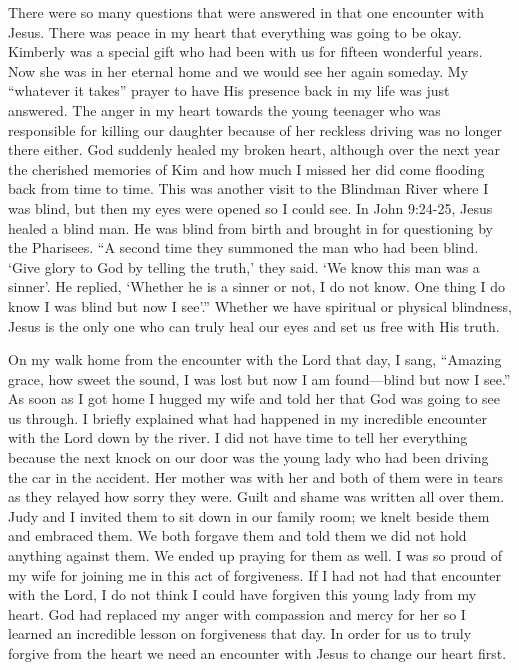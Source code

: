 \documentclass[oneside]{book}
\begin{document}
There were so many questions that were answered in that one encounter with Jesus. There was peace in my heart that everything was going to be okay. Kimberly was a special gift who had been with us for fifteen wonderful years. Now she was in her eternal home and we would see her again someday. My “whatever it takes” prayer to have His presence back in my life was just answered. The anger in my heart towards the young teenager who was responsible for killing our daughter because of her reckless driving was no longer there either. God suddenly healed my broken heart, although over the next year the cherished memories of Kim and how much I missed her did come flooding back from time to time. This was another visit to the Blindman River where I was blind, but then my eyes were opened so I could see. In John 9:24-25, Jesus  healed a blind man. He was blind from birth and brought in for questioning by the Pharisees. “A second time they summoned the man who had been blind. ‘Give glory to God by telling the truth,’ they said. ‘We know this man was a sinner’. He replied, ‘Whether he is a sinner or not, I do not know. One thing I do know I was blind but now I see’.” Whether we have spiritual or physical blindness, Jesus is the only one who can truly heal our eyes and set us free with His truth.

On my walk home from the encounter with the Lord that day, I sang, “Amazing grace, how sweet the sound, I was lost but now I am found—blind but now I see.” As soon as I got home I hugged my wife and told her that God was going to see us through. I briefly explained what had happened in my incredible encounter with the Lord down by the river. I did not have time to tell her everything because the next knock on our door was the young lady who had been driving the car in the accident. Her mother was with her and both of them were in tears as they relayed how sorry they were. Guilt and shame was written all over them. Judy and I invited them to sit down in our family room; we knelt beside them and embraced them. We both forgave them and told them we did not hold anything against them. We ended up praying for them as well. I was so proud of my wife for joining me in this act of forgiveness. If I had not had that encounter with the Lord, I do not think I could have forgiven this young lady from my heart. God had replaced my anger with compassion and mercy for her so I learned an incredible lesson on forgiveness that day. In order for us to truly forgive from the heart we need an encounter with Jesus to change our heart first.
\end{document}
